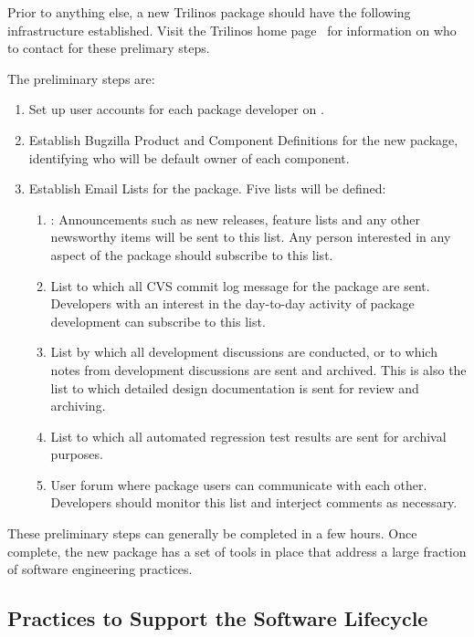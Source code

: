 \documentclass[12pt,strict]{TrilinosDevGuide}
\begin{document}
Prior to anything else, a new Trilinos package should have the
following infrastructure established.  Visit the Trilinos home
page~\cite{Trilinos-home-page} for information on who to contact for
these prelimary steps.

The preliminary steps are:
\begin{enumerate}
\item Set up user accounts for each package developer 
on .
\item Establish Bugzilla Product and Component Definitions for the new
package, identifying who will be default owner of each component.
\item Establish Email Lists for the package.  Five lists will be
defined:
\begin{enumerate}
\item {}: 
Announcements such as 
new releases, feature lists and any other newsworthy items will be
sent to this list.  Any person interested in any aspect of the package
should subscribe to this list.
\item {} List
to which all CVS commit log message for the package are sent.
Developers with an interest in the day-to-day activity of package
development can subscribe to this list.
\item {}
List by which all development discussions are conducted, or to which
notes from development discussions are sent and archived.  This is
also the list to which detailed design documentation is sent for
review and archiving.
\item {} List
to which all automated regression test results are sent for archival purposes.
\item {} User
forum where package users can communicate with each other.  Developers
should monitor this list and interject comments as necessary.
\end{enumerate}
\end{enumerate}
These preliminary steps can generally be completed in a few hours.
Once complete, the new package has a set of tools in place that
address a large fraction of software engineering practices.

\subsection{Practices to Support the Software Lifecycle}
\end{document}
